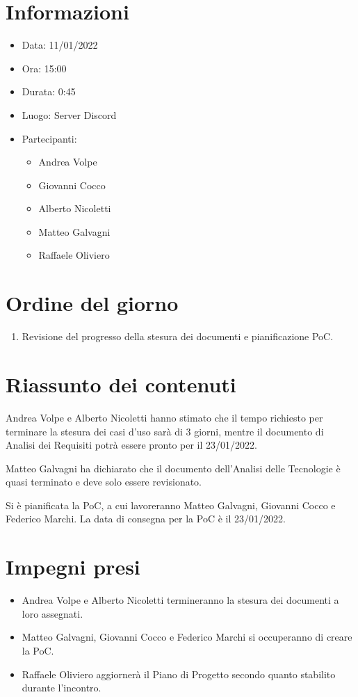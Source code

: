 \documentclass[a4paper, 12pt]{article}
\begin{document}
\makefrontpage

\section{Informazioni}

\begin{itemize}
\item Data: 11/01/2022
\item Ora: 15:00
\item Durata: 0:45
\item Luogo: Server Discord
\item Partecipanti: 
\begin{itemize}
\item Andrea Volpe
\item Giovanni Cocco
\item Alberto Nicoletti
\item Matteo Galvagni
\item Raffaele Oliviero
\end{itemize}
\end{itemize}

\section{Ordine del giorno}
\begin{enumerate}
\item Revisione del progresso della stesura dei documenti e pianificazione PoC.
\end{enumerate}

\section{Riassunto dei contenuti}

Andrea Volpe e Alberto Nicoletti hanno stimato che il tempo richiesto per terminare la stesura dei casi d'uso sarà di 3 giorni, mentre il documento di Analisi dei Requisiti potrà essere pronto per il 23/01/2022.


Matteo Galvagni ha dichiarato che il documento dell'Analisi delle Tecnologie è quasi terminato e deve solo essere revisionato.


Si è pianificata la PoC, a cui lavoreranno Matteo Galvagni, Giovanni Cocco e Federico Marchi. La data di consegna per la PoC è il 23/01/2022.


\section{Impegni presi}
\begin{itemize}
\item Andrea Volpe e Alberto Nicoletti termineranno la stesura dei documenti a loro assegnati.
\item Matteo Galvagni, Giovanni Cocco e Federico Marchi si occuperanno di creare la PoC.
\item Raffaele Oliviero aggiornerà il Piano di Progetto secondo quanto stabilito durante l'incontro.
\end{itemize}
\end{document}
